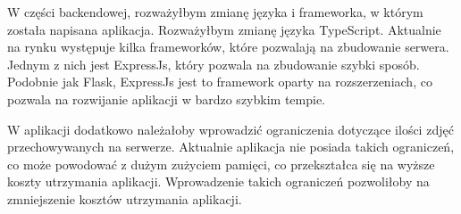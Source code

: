 W części backendowej, rozważyłbym zmianę języka i frameworka, w którym została napisana aplikacja. Rozważyłbym zmianę języka TypeScript. Aktualnie na rynku występuje kilka frameworków, które pozwalają na zbudowanie serwera. Jednym z nich jest ExpressJs, który pozwala na zbudowanie szybki sposób. Podobnie jak Flask, ExpressJs jest to framework oparty na rozszerzeniach, co pozwala na rozwijanie aplikacji w bardzo szybkim tempie.

W aplikacji dodatkowo należałoby wprowadzić ograniczenia dotyczące ilości zdjęć przechowywanych na serwerze. Aktualnie aplikacja nie posiada takich ograniczeń, co może powodować z dużym zużyciem pamięci, co przekształca się na wyższe koszty utrzymania aplikacji. Wprowadzenie takich ograniczeń pozwoliłoby na zmniejszenie kosztów utrzymania aplikacji.
